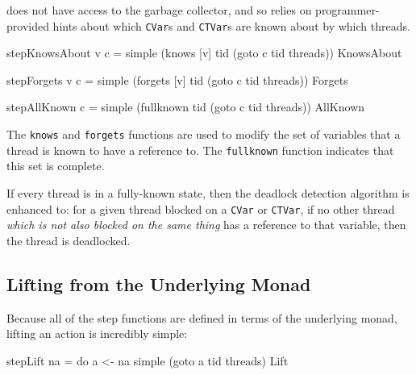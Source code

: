 \dejafu{} does not have access to the garbage collector, and so relies
on programmer-provided hints about which \verb|CVar|s and
\verb|CTVar|s are known about by which threads.

\begin{haskellcode}
stepKnowsAbout v c = simple
  (knows   [v] tid (goto c tid threads)) KnowsAbout

stepForgets    v c = simple
  (forgets [v] tid (goto c tid threads)) Forgets

stepAllKnown     c = simple
  (fullknown   tid (goto c tid threads)) AllKnown
\end{haskellcode}

The \verb|knows| and \verb|forgets| functions are used to modify the
set of variables that a thread is known to have a reference to. The
\verb|fullknown| function indicates that this set is complete.

If every thread is in a fully-known state, then the deadlock detection
algorithm is enhanced to: for a given thread blocked on a \verb|CVar|
or \verb|CTVar|, if no other thread \emph{which is not also blocked on
  the same thing} has a reference to that variable, then the thread is
deadlocked.

\subsection{Lifting from the Underlying Monad}
\label{sec:execution-stepwise-lift}

Because all of the step functions are defined in terms of the
underlying monad, lifting an action is incredibly simple:

\begin{haskellcode}
stepLift na = do
  a <- na
  simple (goto a tid threads) Lift
\end{haskellcode}
